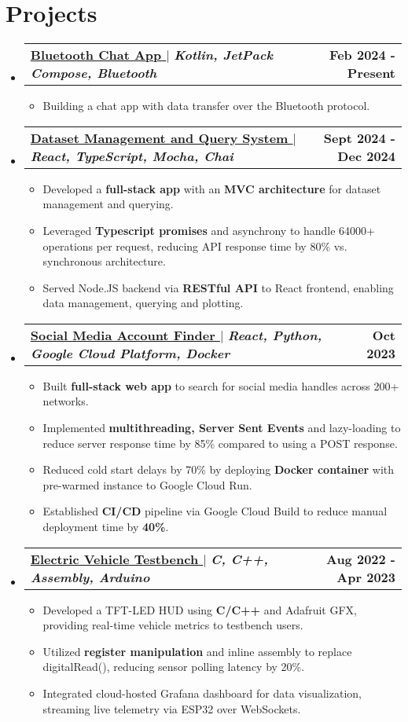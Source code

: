 \documentclass[letterpaper,11pt]{article}
\makeatletter
\newcommand{\bluey}[1]{{\color{customblue}#1}}
\newcommand{\resumeItem}[1]{
  \item\small{
    {#1 \vspace{-2pt}}
  }
}
\newcommand{\resumeProjectHeading}[2]{
    \item
    \begin{tabular*}{1.001\textwidth}{l@{\extracolsep{\fill}}r}
      \small#1 & \textbf{\small #2}\\
    \end{tabular*}\vspace{-7pt}
}
\newcommand{\resumeSubHeadingListStart}{\begin{itemize}[leftmargin=0.0in, label={}]}
\newcommand{\resumeSubHeadingListEnd}{\end{itemize}}
\newcommand{\resumeItemListStart}{\begin{itemize}}
\newcommand{\resumeItemListEnd}{\end{itemize}\vspace{-5pt}}
\makeatother
\begin{document}
\section{Projects}
    \vspace{-5pt}
    \resumeSubHeadingListStart
        \resumeProjectHeading
          {\textbf{\bluey{\href{https://github.com/underscoreHasan/Bluetooth-Chat-App}{Bluetooth Chat App \faLink}}} $|$ \emph{\textbf{Kotlin, JetPack Compose, Bluetooth}}}{Feb 2024 - Present}
          \resumeItemListStart
            \resumeItem{Building a chat app with data transfer over the Bluetooth protocol.}
          \resumeItemListEnd 
          \vspace{-13pt}
      \resumeProjectHeading
          {\textbf{\bluey{\href{https://github.com/underscoreHasan/InsightUBC-Project}{Dataset Management and Query System \faLink}}} $|$ \emph{\textbf{React, TypeScript, Mocha, Chai}}}{Sept 2024 - Dec 2024}
          \resumeItemListStart
            \resumeItem{Developed a \textbf{full-stack app} with an \textbf{MVC architecture} for dataset management and querying.}
            \resumeItem{Leveraged \textbf{Typescript promises} and asynchrony to handle 64000+ operations per request, reducing API response time by 80\% vs. synchronous architecture.}
            \resumeItem{Served Node.JS backend via \textbf{RESTful API} to React frontend, enabling data management, querying and plotting.}
          \resumeItemListEnd 
          \vspace{-13pt}
      \resumeProjectHeading
          {\textbf{\bluey{\href{https://devpost.com/software/sherlockify}{Social Media Account Finder \faLink}}} $|$ \emph{ \textbf{React, Python, Google Cloud Platform, Docker}}}{Oct 2023}
          \resumeItemListStart
            \resumeItem{Built \textbf{full-stack web app} to search for social media handles across 200+ networks.}
            \resumeItem{Implemented \textbf{multithreading, Server Sent Events} and lazy-loading to reduce server response time by 85\% compared to using a POST response.}
            \resumeItem{Reduced cold start delays by 70\% by deploying\textbf{ Docker container} with pre-warmed instance to Google Cloud Run.}
          \resumeItem{Established \textbf{CI/CD} pipeline via Google Cloud Build to reduce manual deployment time by \textbf{40\%}.}
        \resumeItemListEnd
        \vspace{-13pt}
      \resumeProjectHeading
          {\textbf{\bluey{\href{https://github.com/supermileage/dynamometer-firmware}{Electric Vehicle Testbench \faLink}}} $|$ \emph{\textbf{C, C++, Assembly, Arduino}}}{Aug 2022 - Apr 2023}
          \resumeItemListStart
            \resumeItem{Developed a TFT-LED HUD using \textbf{C/C++} and Adafruit GFX, providing real-time vehicle metrics to testbench users.}
            \resumeItem{Utilized \textbf{register manipulation} and inline assembly to replace digitalRead(), reducing sensor polling latency by 20\%.}
            \resumeItem{Integrated cloud-hosted Grafana dashboard for data visualization, streaming live telemetry via ESP32 over WebSockets.}
          \resumeItemListEnd 
    \resumeSubHeadingListEnd
\vspace{-15pt}
\end{document}

